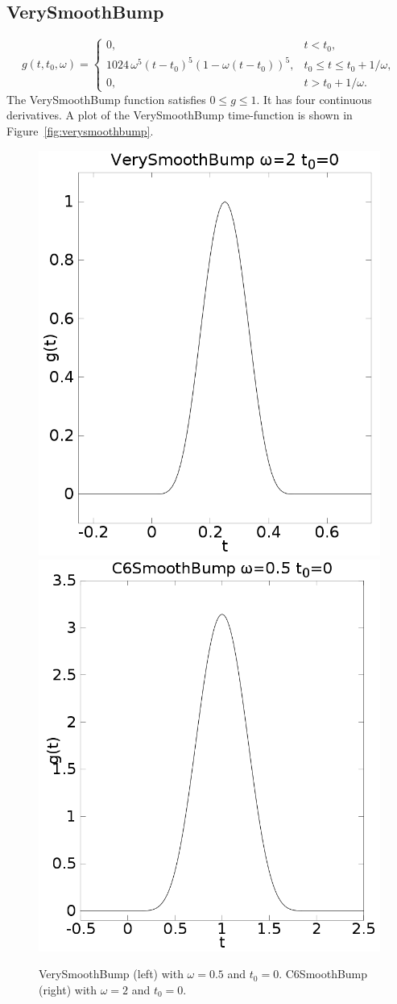 \documentclass[11pt]{report}
\begin{document}
\subsection{VerySmoothBump} 
\[
g(t,t_0,\omega) = \left\{ 
\begin{array}{ll} 
0, & t < t_0,\\ 
1024\,\omega^5(t-t_0)^5 (1 - \omega(t-t_0))^5,& t_0 \leq t \leq t_0+1/\omega,\\ 
0, & t > t_0 + 1/\omega.
\end{array}
\right.
\]
The VerySmoothBump function satisfies $0\leq g\leq 1$. It has four continuous derivatives.
A plot of the VerySmoothBump time-function is shown in Figure~\ref{fig:verysmoothbump}.
\begin{figure}
\begin{centering}
  \includegraphics[height=0.4\linewidth]{f11-verysmoothbump.png}
\hspace{10mm}
  \includegraphics[height=0.4\linewidth]{f12-c6smoothbump.png}
  \caption{VerySmoothBump (left) with $\omega=0.5$ and
    $t_0=0$. C6SmoothBump (right) with $\omega=2$ and $t_0=0$.}
  \label{fig:verysmoothbump}  \label{fig:c6smoothbump}
\end{centering}
\end{figure}  
%
\end{document}
